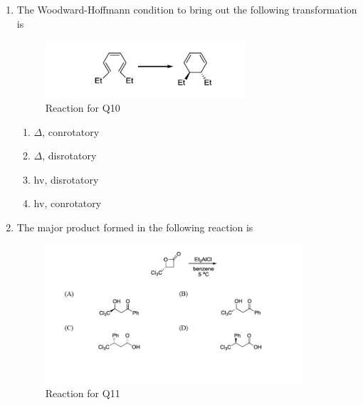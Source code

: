 \documentclass[journal,12pt,onecolumn]{IEEEtran}
\theoremstyle{remark}
\begin{document}
\begin{enumerate}
\item The Woodward-Hoffmann condition to bring out the following transformation is \hfill{}


\begin{figure}[h!]
    \centering
    \includegraphics[width=0.7\textwidth]{figs/image4.png}
    \caption{Reaction for Q10}
    \label{fig:q10reaction}
\end{figure}



\begin{multicols}{2}
\begin{enumerate}
    \item $\Delta$, conrotatory
    \item $\Delta$, disrotatory
    \item hv, disrotatory
    \item hv, conrotatory
\end{enumerate}
\end{multicols}

\item The major product formed in the following reaction is \hfill{}

\begin{figure}[h!]
    \centering
    \includegraphics[width=0.9\textwidth]{figs/image5.png}
    \caption{Reaction for Q11}
    \label{fig:q11reaction}
\end{figure}

\newpage


\end{enumerate}
\end{document}
